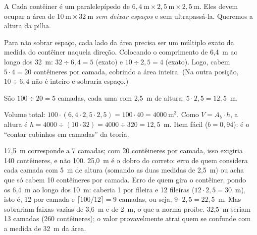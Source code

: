 \begin{resolucao}{A}
 Cada contêiner é um paralelepípedo de
$6{,}4\ \text{m}\times 2{,}5\ \text{m}\times 2{,}5\ \text{m}$. Eles devem ocupar a
área de $10\ \text{m}\times 32\ \text{m}$ \emph{sem deixar espaços} e sem
ultrapassá-la. Queremos a altura da pilha.

 Para não sobrar espaço, cada
lado da área precisa ser um múltiplo exato da medida do contêiner naquela
direção. Colocando o comprimento de 6,4~m ao longo dos 32~m:
$32 \div 6{,}4 = 5$ (exato) e $10 \div 2{,}5 = 4$ (exato). Logo, cabem
$5\cdot 4 = 20$ contêineres por camada, cobrindo a área inteira. (Na outra
posição, $10\div 6{,}4$ não é inteiro e sobraria espaço.)

 São $100 \div 20 = 5$ camadas, cada uma
com 2,5~m de altura: $5\cdot 2{,}5 = 12{,}5$~m.

 Volume total:
$100\cdot(6{,}4\cdot 2{,}5\cdot 2{,}5) = 100\cdot 40 = 4000\ \text{m}^3$. Como
$V = A_b\cdot h$, a altura é $h = 4000 \div (10\cdot 32) = 4000\div 320 = 12{,}5$~m.
Item fácil ($b = 0{,}94$): é o “contar cubinhos em camadas” da teoria.

\begin{distratores}
 17,5~m corresponde a 7 camadas; com 20 contêineres por camada, isso
exigiria 140 contêineres, e não 100.
 25,0~m é o dobro do correto: erro de quem considera cada camada com 5~m
de altura (somando as duas medidas de 2,5~m) ou acha que só cabem 10 contêineres
por camada.
 Erro de quem gira o contêiner, pondo os 6,4~m ao longo dos 10~m: caberia 1
por fileira e 12 fileiras ($12\cdot 2{,}5 = 30$~m), isto é, 12 por camada e
$\lceil 100/12\rceil = 9$ camadas, ou seja, $9\cdot 2{,}5 = 22{,}5$~m. Mas sobrariam
faixas vazias de 3,6~m e de 2~m, o que a norma proíbe.
 32,5~m seriam 13 camadas (260 contêineres); o valor provavelmente atrai
quem se confunde com a medida de 32~m da área.
\end{distratores}
\end{resolucao}


